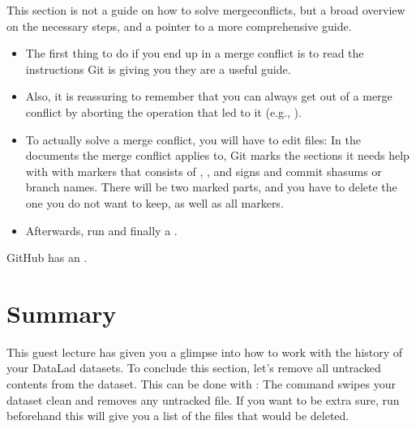 \sphinxAtStartPar
This section is not a guide on how to solve merge\sphinxhyphen{}conflicts, but a broad
overview on the necessary steps, and a pointer to a more comprehensive guide.
\begin{itemize}
\item {} 
\sphinxAtStartPar
The first thing to do if you end up in a merge conflict is
to read the instructions Git is giving you \textendash{} they are a useful guide.

\item {} 
\sphinxAtStartPar
Also, it is reassuring to remember that you can always get out of
a merge conflict by aborting the operation that led to it (e.g.,
).

\item {} 
\sphinxAtStartPar
To actually solve a merge conflict, you will have to edit files: In the
documents the merge conflict applies to, Git marks the sections it needs
help with with markers that consists of \sphinxcode{\sphinxupquote{\textgreater{}}}, \sphinxcode{\sphinxupquote{\textless{}}}, and \sphinxcode{\sphinxupquote{=}}
signs and commit shasums or branch names.
There will be two marked parts, and you have to delete the one you do not
want to keep, as well as all markers.

\item {} 
\sphinxAtStartPar
Afterwards, run  and finally a .

\end{itemize}

\sphinxAtStartPar
GitHub has an .


\section{Summary}
\label{\detokenize{basics/101-137-history:summary}}
\sphinxAtStartPar
This guest lecture has given you a glimpse into how to work with the
history of your DataLad datasets.
To conclude this section, let’s remove all untracked contents from
the dataset. This can be done with : The command
 swipes your dataset clean and removes any untracked
file.
If you want to be extra sure, run  beforehand \textendash{} this will
give you a list of the files that would be deleted.

